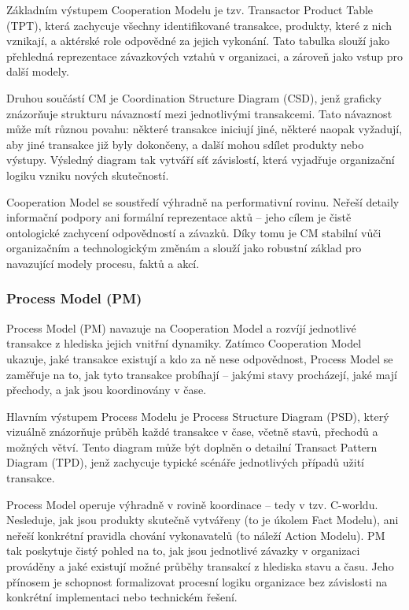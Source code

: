 Základním výstupem Cooperation Modelu je tzv. Transactor Product Table (TPT), která zachycuje všechny identifikované transakce, produkty, které z nich vznikají, a aktérské role odpovědné za jejich vykonání. Tato tabulka slouží jako přehledná reprezentace závazkových vztahů v organizaci, a zároveň jako vstup pro další modely. \cite{Pergl2023DEMO_modely}

Druhou součástí CM je Coordination Structure Diagram (CSD), jenž graficky znázorňuje strukturu návazností mezi jednotlivými transakcemi. Tato návaznost může mít různou povahu: některé transakce iniciují jiné, některé naopak vyžadují, aby jiné transakce již byly dokončeny, a další mohou sdílet produkty nebo výstupy. Výsledný diagram tak vytváří síť závislostí, která vyjadřuje organizační logiku vzniku nových skutečností. \cite{Pergl2023DEMO_modely}

 Cooperation Model se soustředí výhradně na performativní rovinu. Neřeší detaily informační podpory ani formální reprezentace aktů – jeho cílem je čistě ontologické zachycení odpovědností a závazků. Díky tomu je CM stabilní vůči organizačním a technologickým změnám a slouží jako robustní základ pro navazující modely procesu, faktů a akcí. \cite{Dietz1999, Dietz2020}


\subsubsection{Process Model (PM)}
\label{sec:process-model}

Process Model (PM) navazuje na Cooperation Model a rozvíjí jednotlivé transakce z hlediska jejich vnitřní dynamiky. Zatímco Cooperation Model ukazuje, jaké transakce existují a kdo za ně nese odpovědnost, Process Model se zaměřuje na to, jak tyto transakce probíhají – jakými stavy procházejí, jaké mají přechody, a jak jsou koordinovány v čase. \cite{Dietz2020,Pergl2023DEMO_modely}

Hlavním výstupem Process Modelu je Process Structure Diagram (PSD), který vizuálně znázorňuje průběh každé transakce v čase, včetně stavů, přechodů a možných větví. Tento diagram může být doplněn o detailní Transact Pattern Diagram (TPD), jenž zachycuje typické scénáře jednotlivých případů užití transakce. \cite{Pergl2023DEMO_modely}

Process Model operuje výhradně v rovině koordinace – tedy v tzv. C-worldu. Nesleduje, jak jsou produkty skutečně vytvářeny (to je úkolem Fact Modelu), ani neřeší konkrétní pravidla chování vykonavatelů (to náleží Action Modelu). PM tak poskytuje čistý pohled na to, jak jsou jednotlivé závazky v organizaci prováděny a jaké existují možné průběhy transakcí z hlediska stavu a času. Jeho přínosem je schopnost formalizovat procesní logiku organizace bez závislosti na konkrétní implementaci nebo technickém řešení. \cite{Dietz2020}

